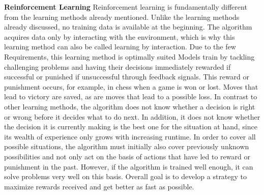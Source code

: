 \textbf{Reinforcement Learning}
Reinforcement learning is fundamentally different from the learning methods already mentioned.
Unlike the learning methods already discussed, no training data is available at the beginning.\cite[351]{Ertel2021}
The algorithm acquires data only by interacting with the environment,
which is why this learning method can also be called learning by interaction.
Due to the few Requirements, this learning method is optimally suited\cite[98]{schacht2019blockchain}
Models train by tackling challenging problems and having their decisions immediately rewarded
if successful or punished if unsuccessful through feedback signals.
This reward or punishment occurs, for example, in chess when a game is won or lost.
Moves that lead to victory are saved, as are moves that lead to a possible loss.\cite[98]{schacht2019blockchain}
In contrast to other learning methods, the algorithm does not know whether a decision is right or
wrong before it decides what to do next.
In addition, it does not know whether the decision it is currently making is the best one for the situation at hand,
since its wealth of experience only grows with increasing runtime. In order to cover all possible situations,
the algorithm must initially also cover previously unknown possibilities and not only act on the basis of actions
that have led to reward or punishment in the past.
However, if the algorithm is trained well enough, it can solve problems very well on this basis.
Overall goal is to develop a strategy to maximize rewards received and get better as fast as possible.\cite[351]{Ertel2021}